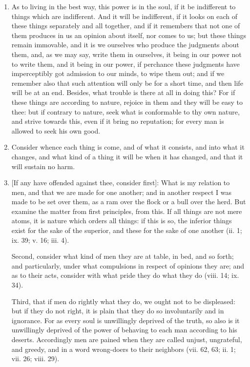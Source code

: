 \begin{enumerate}
\item As to living in the best way, this power is in the soul, if it be indifferent to things which are indifferent. And it will be indifferent, if it looks on each of these things separately and all together, and if it remembers that not one of them produces in us an opinion about itself, nor comes to us; but these things remain immovable, and it is we ourselves who produce the judgments about them, and, as we may say, write them in ourselves, it being in our power not to write them, and it being in our power, if perchance these judgments have imperceptibly got admission to our minds, to wipe them out; and if we remember also that such attention will only be for a short time, and then life will be at an end. Besides, what trouble is there at all in doing this? For if these things are according to nature, rejoice in them and they will be easy to thee: but if contrary to nature, seek what is conformable to thy own nature, and strive towards this, even if it bring no reputation; for every man is allowed to seek his own good.

\item Consider whence each thing is come, and of what it consists, and into what it changes, and what kind of a thing it will be when it has changed, and that it will sustain no harm.

\item {[{\clarify If any have offended against thee, consider first}]}: What is my relation to men, and that we are made for one another; and in another respect I was made to be set over them, as a ram over the flock or a bull over the herd. But examine the matter from first principles, from this. If all things are not mere atoms, it is nature which orders all things: if this is so, the inferior things exist for the sake of the superior, and these for the sake of one another (ii. 1; ix. 39; v. 16; iii. 4).

Second, consider what kind of men they are at table, in bed, and so forth; and particularly, under what compulsions in respect of opinions they are; and as to their acts, consider with what pride they do what they do (viii. 14; ix. 34).

Third, that if men do rightly what they do, we ought not to be displeased: but if they do not right, it is plain that they do so involuntarily and in ignorance. For as every soul is unwillingly deprived of the truth, so also is it unwillingly deprived of the power of behaving to each man according to his deserts. Accordingly men are pained when they are called unjust, ungrateful, and greedy, and in a word wrong-doers to their neighbors (vii. 62, 63; ii. 1; vii. 26; viii. 29).


\end{enumerate}
